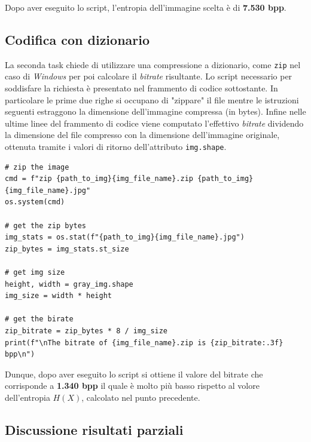 \noindent Dopo aver eseguito lo script, l'entropia dell'immagine scelta è di \textbf{7.530 bpp}.





\vspace{15px}\subsection{Codifica con dizionario}
La seconda task chiede di utilizzare una compressione a dizionario, come \texttt{zip} nel caso di \textsl{Windows} per poi calcolare il \textsl{bitrate} risultante. Lo script necessario per soddisfare la richiesta è presentato nel frammento di codice sottostante. In particolare le prime due righe si occupano di "zippare" il file mentre le istruzioni seguenti estraggono la dimensione dell'immagine compressa (in bytes). Infine nelle ultime linee del frammento di codice viene computato l'effettivo \textsl{bitrate} dividendo la dimensione del file compresso con la dimensione dell'immagine originale, ottenuta tramite i valori di ritorno dell'attributo \texttt{img.shape}.

\begin{lstlisting}
# zip the image
cmd = f"zip {path_to_img}{img_file_name}.zip {path_to_img}{img_file_name}.jpg"
os.system(cmd)

# get the zip bytes
img_stats = os.stat(f"{path_to_img}{img_file_name}.jpg")
zip_bytes = img_stats.st_size

# get img size
height, width = gray_img.shape
img_size = width * height

# get the birate
zip_bitrate = zip_bytes * 8 / img_size 
print(f"\nThe bitrate of {img_file_name}.zip is {zip_bitrate:.3f} bpp\n")
    \end{lstlisting}

\noindent Dunque, dopo aver eseguito lo script si ottiene il valore del bitrate che corrisponde a \textbf{1.340 bpp} il quale è molto più basso rispetto al volore dell'entropia $H(X)$, calcolato nel punto precedente.





\vspace{15px}\subsection{Discussione risultati parziali}





